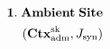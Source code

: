 \documentclass[preview]{standalone}
\begin{document}
\begin{align*}
\special{dvisvgm:raw <g id='unique000'>}\mathbf{1.\;Ambient\;Site}\\(\mathbf{Ctx}_{\text{adm}}^{\text{sk}}, J_{\text{syn}})\special{dvisvgm:raw </g>}
\end{align*}
\end{document}
